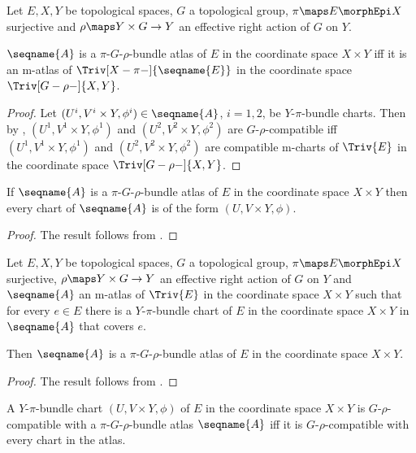 \documentclass{article}
\begin{document}
\begin{lemma}
\label{lem:Bun-Atl}
Let $E,X,Y$ be topological spaces, $G$ a topological group,
$\pi \maps E \morphEpi X$ surjective and $\rho \maps Y \times G \to Y$ an
effective right action of $G$ on $Y$.

$\seqname{A}$ is a $\pi$-$G$-$\rho$-bundle atlas of $E$ in the
coordinate space $X \times Y$ iff it is an m-atlas of
$\Triv[X-\pi-]{\seqname{E}}$ in the coordinate space
$\Triv[G-\rho-]{X,Y}$.

\begin{proof}
Let $(U^i, V^i \times Y, \phi^i) \in \seqname{A}$, $i=1,2$, be
$Y$-$\pi$-bundle charts.  Then by ,
$(U^1, V^1 \times Y, \phi^1)$ and $(U^2, V^2 \times Y, \phi^2)$ are
$G$-$\rho$-compatible iff $(U^1, V^1 \times Y, \phi^1)$ and
$(U^2, V^2 \times Y, \phi^2)$ are compatible m-charts of $\Triv{E}$ in
the coordinate space $\Triv[G-\rho-]{X,Y}$.
\end{proof}

If $\seqname{A}$ is a $\pi$-$G$-$\rho$-bundle atlas of $E$ in the
coordinate space $X \times Y$ then every chart of $\seqname{A}$ is of
the form $(U, V \times Y, \phi)$.

\begin{proof}
The result follows from .
\end{proof}
\end{lemma}

\begin{corollary}
\label{cor:Bun-Atl}
Let $E,X,Y$ be topological spaces, $G$ a topological group,
$\pi \maps E \morphEpi X$ surjective, $\rho \maps Y \times G \to Y$ an
effective right action of $G$ on $Y$ and $\seqname{A}$ an m-atlas of
$\Triv{E}$ in the coordinate space $X \times Y$ such that for every
$e \in E$ there is a $Y$-$\pi$-bundle chart of $E$ in the coordinate
space $X \times Y$ in $\seqname{A}$ that covers $e$.

Then $\seqname{A}$ is a $\pi$-$G$-$\rho$-bundle atlas of $E$ in the
coordinate space $X \times Y$.

\begin{proof}
The result follows from .
\end{proof}
\end{corollary}

\begin{definition}
\label{def:piGrho-atl:extensions}
A $Y$-$\pi$-bundle chart $(U, V \times Y, \phi)$ of $E$ in the
coordinate space $X \times Y$ is $G$-$\rho$-compatible with a
$\pi$-$G$-$\rho$-bundle atlas $\seqname{A}$ iff it is
$G$-$\rho$-compatible with every chart in the atlas.
\end{definition}
\end{document}
